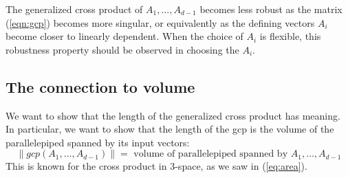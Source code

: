\documentclass[10pt]{article}
\begin{document}
The generalized cross product of $A_1,\ldots,A_{d-1}$ becomes less robust
as the matrix (\ref{eqn:gcp}) becomes more singular, or equivalently
as the defining vectors $A_i$ become closer to linearly dependent.
When the choice of $A_i$ is flexible, this robustness property should
be observed in choosing the $A_i$.

\clearpage

\subsection{The connection to volume}

We want to show that the length of the generalized cross product has meaning.
In particular, we want to show that the length of the gcp is
the volume of the parallelepiped spanned by its input vectors:
\begin{equation}
\label{eq:volume}
\| gcp(A_1,\ldots,A_{d-1}) \| = \mbox{ volume of parallelepiped spanned by } A_1, \ldots, A_{d-1}
\end{equation}
This is known for the cross product in 3-space, as we saw in (\ref{eq:area}).
\end{document}
